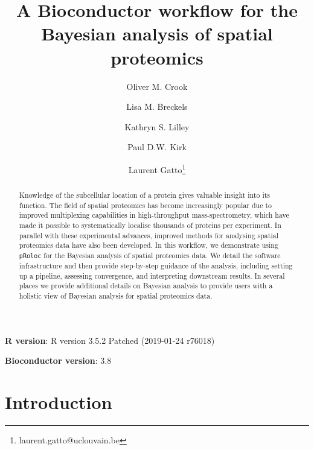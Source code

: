 \documentclass[9pt,a4paper,]{extarticle}
\begin{document}
\pagestyle{front}

\title{A Bioconductor workflow for the Bayesian analysis of spatial proteomics}

\author[1,2]{Oliver M. Crook}
\author[1]{Lisa M. Breckels}
\author[1]{Kathryn S. Lilley}
\author[2]{Paul D.W. Kirk}
\author[3]{Laurent Gatto\thanks{\ttfamily laurent.gatto@uclouvain.be}}

\maketitle
\thispagestyle{front}

\begin{abstract}
Knowledge of the subcellular location of a protein gives valuable insight into its function. The field of spatial proteomics has become increasingly popular due to improved multiplexing capabilities in high-throughput mass-spectrometry, which have made it possible to systematically localise thousands of proteins per experiment. In parallel with these experimental advances, improved methods for analysing spatial proteomics data have also been developed. In this workflow, we demonstrate using \texttt{pRoloc} for the Bayesian analysis of spatial proteomics data. We detail the software infrastructure and then provide step-by-step guidance of the analysis, including setting up a pipeline, assessing convergence, and interpreting downstream results. In several places we provide additional details on Bayesian analysis to provide users with a holistic view of Bayesian analysis for spatial proteomics data.
\end{abstract}


\clearpage
\pagestyle{main}

\newcommand{\diag}{\mathop{\mathrm{diag}}}

\textbf{R version}: R version 3.5.2 Patched (2019-01-24 r76018)

\textbf{Bioconductor version}: 3.8

\hypertarget{introduction}{%
\section{Introduction}\label{introduction}}
\end{document}

